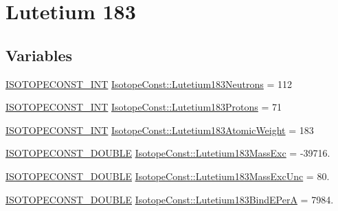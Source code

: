 \hypertarget{group___isotope_const-_lutetium-_lu183}{}\section{Lutetium 183}
\label{group___isotope_const-_lutetium-_lu183}
\subsection*{Variables}
\begin{DoxyCompactItemize}
\item 
\mbox{\hyperlink{group___isotope_const-_macros_ga5f18360b3e99483a35c32d789e62621c}{I\+S\+O\+T\+O\+P\+E\+C\+O\+N\+S\+T\+\_\+\+I\+NT}} \mbox{\hyperlink{group___isotope_const-_lutetium-_lu183_ga111186c93ad9552845571054079dabd2}{Isotope\+Const\+::\+Lutetium183\+Neutrons}} = 112
\item 
\mbox{\hyperlink{group___isotope_const-_macros_ga5f18360b3e99483a35c32d789e62621c}{I\+S\+O\+T\+O\+P\+E\+C\+O\+N\+S\+T\+\_\+\+I\+NT}} \mbox{\hyperlink{group___isotope_const-_lutetium-_lu183_gac3ec6dfc1f8b179f70e3360a815716c5}{Isotope\+Const\+::\+Lutetium183\+Protons}} = 71
\item 
\mbox{\hyperlink{group___isotope_const-_macros_ga5f18360b3e99483a35c32d789e62621c}{I\+S\+O\+T\+O\+P\+E\+C\+O\+N\+S\+T\+\_\+\+I\+NT}} \mbox{\hyperlink{group___isotope_const-_lutetium-_lu183_ga57d8bef2f2c64a6a4825371045719356}{Isotope\+Const\+::\+Lutetium183\+Atomic\+Weight}} = 183
\item 
\mbox{\hyperlink{group___isotope_const-_macros_ga8f45a7272ce02c0b4c65c44636ed719a}{I\+S\+O\+T\+O\+P\+E\+C\+O\+N\+S\+T\+\_\+\+D\+O\+U\+B\+LE}} \mbox{\hyperlink{group___isotope_const-_lutetium-_lu183_ga87609ac1c98b9c4ddd1c41a6630e0af7}{Isotope\+Const\+::\+Lutetium183\+Mass\+Exc}} = -\/39716.
\item 
\mbox{\hyperlink{group___isotope_const-_macros_ga8f45a7272ce02c0b4c65c44636ed719a}{I\+S\+O\+T\+O\+P\+E\+C\+O\+N\+S\+T\+\_\+\+D\+O\+U\+B\+LE}} \mbox{\hyperlink{group___isotope_const-_lutetium-_lu183_ga97b757340d2786ac5b61b4fcb23a61ce}{Isotope\+Const\+::\+Lutetium183\+Mass\+Exc\+Unc}} = 80.
\item 
\mbox{\hyperlink{group___isotope_const-_macros_ga8f45a7272ce02c0b4c65c44636ed719a}{I\+S\+O\+T\+O\+P\+E\+C\+O\+N\+S\+T\+\_\+\+D\+O\+U\+B\+LE}} \mbox{\hyperlink{group___isotope_const-_lutetium-_lu183_ga12452b010b70fe6b3e92e04e7c75226d}{Isotope\+Const\+::\+Lutetium183\+Bind\+E\+PerA}} = 7984.
\item 

\end{DoxyCompactItemize}
